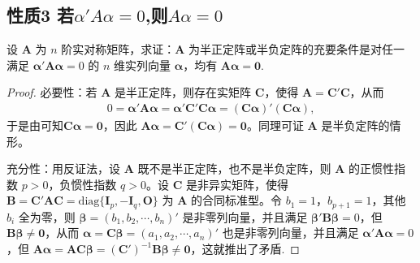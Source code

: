 \documentclass[../../main.tex]{subfiles}
\begin{document}
\subsection{性质3 若$\alpha'A\alpha=0$,则$A\alpha=0$}

\begin{proposition}\label{proposition:半正/负定阵关于线性方程的充要条件}
设 $\boldsymbol{A}$ 为 $n$ 阶实对称矩阵，求证：$\boldsymbol{A}$ 为半正定阵或半负定阵的充要条件是对任一满足 $\boldsymbol{\alpha}'\boldsymbol{A}\boldsymbol{\alpha}=0$ 的 $n$ 维实列向量 $\boldsymbol{\alpha}$，均有 $\boldsymbol{A}\boldsymbol{\alpha}=\boldsymbol{0}$.
\end{proposition}
\begin{proof}
{\heiti 必要性：}若 $\boldsymbol{A}$ 是半正定阵，则存在实矩阵 $\boldsymbol{C}$，使得 $\boldsymbol{A}=\boldsymbol{C}'\boldsymbol{C}$，从而
\begin{align*}
0 = \boldsymbol{\alpha}'\boldsymbol{A}\boldsymbol{\alpha}=\boldsymbol{\alpha}'\boldsymbol{C}'\boldsymbol{C}\boldsymbol{\alpha}=(\boldsymbol{C}\boldsymbol{\alpha})'(\boldsymbol{C}\boldsymbol{\alpha}),
\end{align*}
于是由可知$\boldsymbol{C}\boldsymbol{\alpha}=\boldsymbol{0}$，因此 $\boldsymbol{A}\boldsymbol{\alpha}=\boldsymbol{C}'(\boldsymbol{C}\boldsymbol{\alpha})=\boldsymbol{0}$。同理可证 $\boldsymbol{A}$ 是半负定阵的情形。

{\heiti 充分性：}用反证法，设 $\boldsymbol{A}$ 既不是半正定阵，也不是半负定阵，则 $\boldsymbol{A}$ 的正惯性指数 $p > 0$，负惯性指数 $q > 0$。设 $\boldsymbol{C}$ 是非异实矩阵，使得 $\boldsymbol{B}=\boldsymbol{C}'\boldsymbol{A}\boldsymbol{C}=\mathrm{diag}\{\boldsymbol{I}_p,-\boldsymbol{I}_q,\boldsymbol{O}\}$ 为 $\boldsymbol{A}$ 的合同标准型。令 $b_1 = 1$，$b_{p + 1}= 1$，其他 $b_i$ 全为零，则 $\boldsymbol{\beta}=(b_1,b_2,\cdots,b_n)'$ 是非零列向量，并且满足 $\boldsymbol{\beta}'\boldsymbol{B}\boldsymbol{\beta}=0$，但 $\boldsymbol{B}\boldsymbol{\beta}\neq\boldsymbol{0}$，从而 $\boldsymbol{\alpha}=\boldsymbol{C}\boldsymbol{\beta}=(a_1,a_2,\cdots,a_n)'$ 也是非零列向量，并且满足 $\boldsymbol{\alpha}'\boldsymbol{A}\boldsymbol{\alpha}=0$，但 $\boldsymbol{A}\boldsymbol{\alpha}=\boldsymbol{A}\boldsymbol{C}\boldsymbol{\beta}=(\boldsymbol{C}')^{-1}\boldsymbol{B}\boldsymbol{\beta}\neq\boldsymbol{0}$，这就推出了矛盾.
\end{proof}
\end{document}
